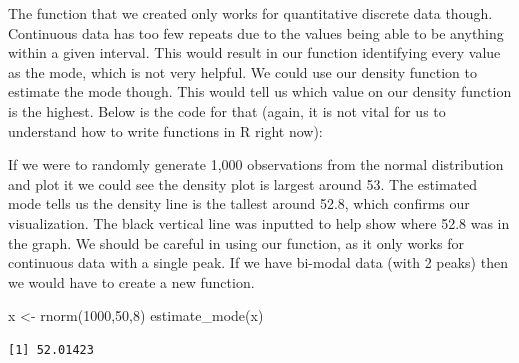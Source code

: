 \documentclass[
  letterpaper,
  DIV=11,
  numbers=noendperiod]{scrreprt}
\newenvironment{Shaded}{\begin{snugshade}}{\end{snugshade}}
\newcommand{\AttributeTok}[1]{\textcolor[rgb]{0.40,0.45,0.13}{#1}}
\newcommand{\ConstantTok}[1]{\textcolor[rgb]{0.56,0.35,0.01}{#1}}
\newcommand{\ControlFlowTok}[1]{\textcolor[rgb]{0.00,0.23,0.31}{\textbf{#1}}}
\newcommand{\DecValTok}[1]{\textcolor[rgb]{0.68,0.00,0.00}{#1}}
\newcommand{\FunctionTok}[1]{\textcolor[rgb]{0.28,0.35,0.67}{#1}}
\newcommand{\NormalTok}[1]{\textcolor[rgb]{0.00,0.23,0.31}{#1}}
\newcommand{\OtherTok}[1]{\textcolor[rgb]{0.00,0.23,0.31}{#1}}
\newcommand{\SpecialCharTok}[1]{\textcolor[rgb]{0.37,0.37,0.37}{#1}}
\begin{document}
The function that we created only works for quantitative discrete data
though. Continuous data has too few repeats due to the values being able
to be anything within a given interval. This would result in our
function identifying every value as the mode, which is not very helpful.
We could use our density function to estimate the mode though. This
would tell us which value on our density function is the highest. Below
is the code for that (again, it is not vital for us to understand how to
write functions in R right now):

\begin{Shaded}
\end{Shaded}

If we were to randomly generate 1,000 observations from the normal
distribution and plot it we could see the density plot is largest around
53. The estimated mode tells us the density line is the tallest around
52.8, which confirms our visualization. The black vertical line was
inputted to help show where 52.8 was in the graph. We should be careful
in using our function, as it only works for continuous data with a
single peak. If we have bi-modal data (with 2 peaks) then we would have
to create a new function.

\begin{Shaded}
\begin{Highlighting}[]
\NormalTok{x }\OtherTok{\textless{}{-}} \FunctionTok{rnorm}\NormalTok{(}\DecValTok{1000}\NormalTok{,}\DecValTok{50}\NormalTok{,}\DecValTok{8}\NormalTok{)}
\FunctionTok{estimate\_mode}\NormalTok{(x)}
\end{Highlighting}
\end{Shaded}

\begin{verbatim}
[1] 52.01423
\end{verbatim}
\end{document}
